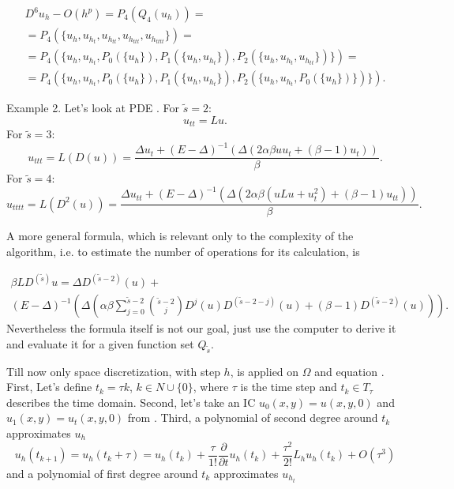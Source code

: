 \documentclass[11pt,a4paper,twoside]{article}
\begin{document}
\begin{align*} 
D^6 u_h - O(h^p) = P_4(Q_4(u_h)) =
\\
= P_4(\{u_{ h}, u_{ h_{t} }, u_{ h_{tt} }, u_{ h_{ttt} }, u_{ h_{tttt} } \}) = 
\\
= P_4(\{u_{ h}, u_{ h_{t} }, P_0(\{u_h\}),  P_1( \{ u_h, u_{ h_{t} } \} ), P_2( \{ u_h, u_{ h_{t} }, u_{ h_{tt} } \} )  \}) = 
\\ 
= P_4(\{u_{ h}, u_{ h_{t} }, P_0(\{u_h\}),  P_1( \{ u_h, u_{ h_{t} } \} ), P_2( \{ u_h, u_{ h_{t} },  P_0( \{ u_h \} ) \} )  \}).
\end{align*}

Example 2. Let's look at PDE . For $\tilde s = 2$:
$$
u_{tt} = Lu.
$$
For $\tilde s = 3$:
$$
u_{ttt} = L(D(u)) = \frac{ \Delta u_t + (E - \Delta)^{-1}           ( \Delta (2 \alpha \beta u u_t  +                          (\beta -1)u_t) )  }{\beta}.
$$
For $\tilde s = 4$:
$$
u_{tttt} = L(D^2(u)) = \frac{ \Delta u_{tt} + (E - \Delta)^{-1}( \Delta (2 \alpha \beta ( u Lu +  u_t^2 )   + (\beta -1) u_{tt} ) )  }{\beta}.
$$

A more general formula, which is relevant only to the complexity of the algorithm, i.e. to estimate the number of operations for its calculation, is

\begin{align*}
\beta LD^{(\tilde s)} u =   \Delta D^{ (\tilde s - 2) }(u)  +
\\
 (E - \Delta)^{-1}( \Delta ( \alpha \beta \sum_{j=0}^{ \tilde s - 2}  { \tilde s - 2\choose j} D^j(u) D^{ (\tilde s - 2 - j) }(u)+ (\beta -1) D^{ (\tilde s - 2) }(u) ) ).
\end{align*}
Nevertheless the formula itself is not our goal, just use the computer to derive it and evaluate it for a given function set $Q_{\tilde s}$.
\fi


Till now only space discretization, with step $h$, is applied on $\Omega$ and equation . First, Let's define $t_k = \tau k$, $k \in N \cup \{0\}$, where $\tau$ is the time step and $t_k \in T_{\tau}$ describes the time domain. Second, let's take an IC $u_0(x,y) = u(x,y,0)$ and $u_1(x,y) = u_t(x,y,0)$ from \cite{EllipticProblem}. Third, 
a polynomial of second degree around $t_k$ approximates $u_h$
\begin{equation}\label{taylor21}
u_h(t_{k+1}) = u_h(t_k+\tau) = u_h(t_k) + \frac{\tau } {1!} \frac{ \partial }{ \partial t } u_h( t_k ) + \frac{ \tau^2 } { 2! }L_h u_h( t_k ) + O(\tau^3)
\end{equation}
and a polynomial of first degree around $t_k$ approximates $u_{h_t}$
\end{document}
